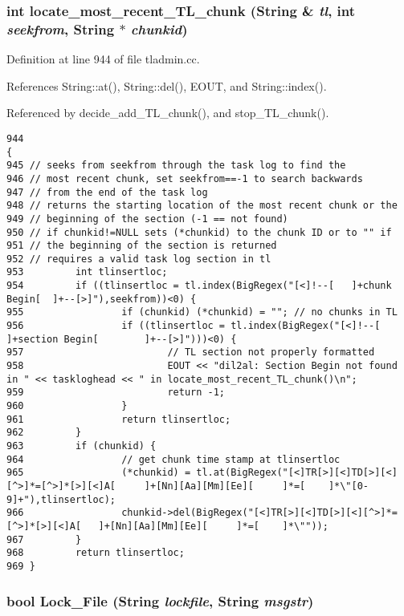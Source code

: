 \subsubsection{\setlength{\rightskip}{0pt plus 5cm}int locate\_\-most\_\-recent\_\-TL\_\-chunk ({\bf String} \& {\em tl}, int {\em seekfrom}, {\bf String} $\ast$ {\em chunkid})}\label{dil2al_8hh_a327}




Definition at line 944 of file tladmin.cc.

References String::at(), String::del(), EOUT, and String::index().

Referenced by decide\_\-add\_\-TL\_\-chunk(), and stop\_\-TL\_\-chunk().



\footnotesize\begin{verbatim}944                                                                              {
945 // seeks from seekfrom through the task log to find the
946 // most recent chunk, set seekfrom==-1 to search backwards
947 // from the end of the task log
948 // returns the starting location of the most recent chunk or the
949 // beginning of the section (-1 == not found)
950 // if chunkid!=NULL sets (*chunkid) to the chunk ID or to "" if
951 // the beginning of the section is returned
952 // requires a valid task log section in tl
953         int tlinsertloc;
954         if ((tlinsertloc = tl.index(BigRegex("[<]!--[   ]+chunk Begin[  ]+--[>]"),seekfrom))<0) {
955                 if (chunkid) (*chunkid) = ""; // no chunks in TL
956                 if ((tlinsertloc = tl.index(BigRegex("[<]!--[   ]+section Begin[        ]+--[>]")))<0) {
957                         // TL section not properly formatted
958                         EOUT << "dil2al: Section Begin not found in " << taskloghead << " in locate_most_recent_TL_chunk()\n";
959                         return -1;
960                 } 
961                 return tlinsertloc;
962         }
963         if (chunkid) {
964                 // get chunk time stamp at tlinsertloc
965                 (*chunkid) = tl.at(BigRegex("[<]TR[>][<]TD[>][<][^>]*=[^>]*[>][<]A[     ]+[Nn][Aa][Mm][Ee][     ]*=[    ]*\"[0-9]+"),tlinsertloc);
966                 chunkid->del(BigRegex("[<]TR[>][<]TD[>][<][^>]*=[^>]*[>][<]A[   ]+[Nn][Aa][Mm][Ee][     ]*=[    ]*\""));
967         }
968         return tlinsertloc;
969 }
\end{verbatim}\normalsize 
{}
\subsubsection{\setlength{\rightskip}{0pt plus 5cm}bool Lock\_\-File ({\bf String} {\em lockfile}, {\bf String} {\em msgstr})}\label{dil2al_8hh_a240}




